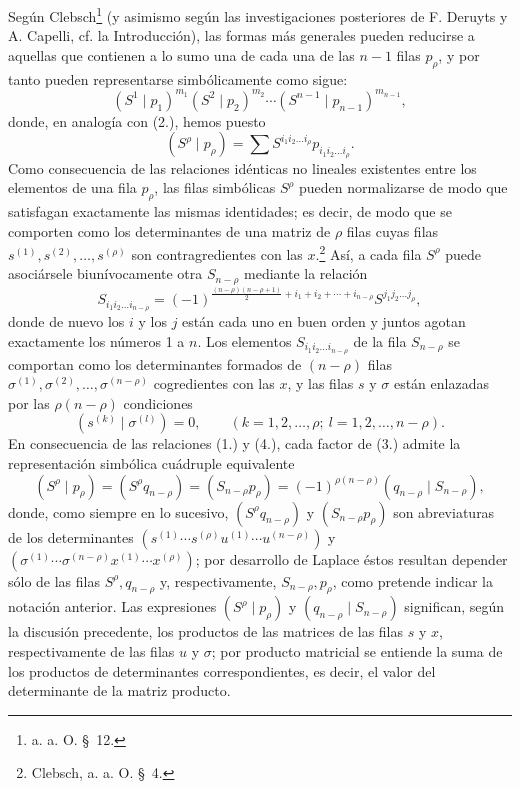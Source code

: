 \documentclass[11pt]{article}
\begin{document}
Según Clebsch\footnote{a. a. O. \S\ 12.} (y asimismo según las investigaciones posteriores de F. Deruyts y A. Capelli, cf. la Introducción), las formas más generales pueden reducirse a aquellas que contienen a lo sumo una de cada una de las $n-1$ filas $p_\rho$, y por tanto pueden representarse simbólicamente como sigue:
\begin{equation}
 (S^1\mid p_1)^{m_1}(S^2\mid p_2)^{m_2}\cdots(S^{n-1}\mid p_{n-1})^{m_{n-1}},
\tag{3}
\end{equation}
donde, en analogía con (2.), hemos puesto
\[
 (S^\rho\mid p_\rho)=\sum S^{i_1i_2\ldots i_\rho}p_{i_1i_2\ldots i_\rho}.
\]
Como consecuencia de las relaciones idénticas no lineales existentes entre los elementos de una fila $p_\rho$, las filas simbólicas $S^\rho$ pueden normalizarse de modo que satisfagan exactamente las mismas identidades; es decir, de modo que se comporten como los determinantes de una matriz de $\rho$ filas cuyas filas $s^{(1)},s^{(2)},\ldots,s^{(\rho)}$ son contragredientes con las $x$.\footnote{Clebsch, a. a. O. \S\ 4.} Así, a cada fila $S^\rho$ puede asociársele biunívocamente otra $S_{n-\rho}$ mediante la relación
\begin{equation}
 S_{i_1i_2\ldots i_{n-\rho}}=(-1)^{\frac{(n-\rho)(n-\rho+1)}2+i_1+i_2+\cdots+i_{n-\rho}}S^{j_1j_2\ldots j_\rho},
\tag{4}
\end{equation}
donde de nuevo los $i$ y los $j$ están cada uno en buen orden y juntos agotan exactamente los números 1 a $n$. Los elementos $S_{i_1i_2\ldots i_{n-\rho}}$ de la fila $S_{n-\rho}$ se comportan como los determinantes formados de $(n-\rho)$ filas $\sigma^{(1)},\sigma^{(2)},\ldots,\sigma^{(n-\rho)}$ cogredientes con las $x$, y las filas $s$ y $\sigma$ están enlazadas por las $\rho(n-\rho)$ condiciones
\begin{equation}
 (s^{(k)}\mid \sigma^{(l)})=0,\qquad(k=1,2,\ldots,\rho;\ l=1,2,\ldots,n-\rho).
\tag{5}
\end{equation}
En consecuencia de las relaciones (1.) y (4.), cada factor de (3.) admite la representación simbólica cuádruple equivalente
\begin{equation}
 (S^\rho\mid p_\rho)=(S^\rho q_{n-\rho})=(S_{n-\rho}p_\rho)=(-1)^{\rho(n-\rho)}(q_{n-\rho}\mid S_{n-\rho}),
\tag{6}
\end{equation}
donde, como siempre en lo sucesivo, $(S^\rho q_{n-\rho})$ y $(S_{n-\rho}p_\rho)$ son abreviaturas de los determinantes $(s^{(1)}\cdots s^{(\rho)}u^{(1)}\cdots u^{(n-\rho)})$ y $(\sigma^{(1)}\cdots\sigma^{(n-\rho)}x^{(1)}\cdots x^{(\rho)})$; por desarrollo de Laplace éstos resultan depender sólo de las filas $S^\rho,q_{n-\rho}$ y, respectivamente, $S_{n-\rho},p_\rho$, como pretende indicar la notación anterior. Las expresiones $(S^\rho\mid p_\rho)$ y $(q_{n-\rho}\mid S_{n-\rho})$ significan, según la discusión precedente, los productos de las matrices de las filas $s$ y $x$, respectivamente de las filas $u$ y $\sigma$; por producto matricial se entiende la suma de los productos de determinantes correspondientes, es decir, el valor del determinante de la matriz producto.
\end{document}
